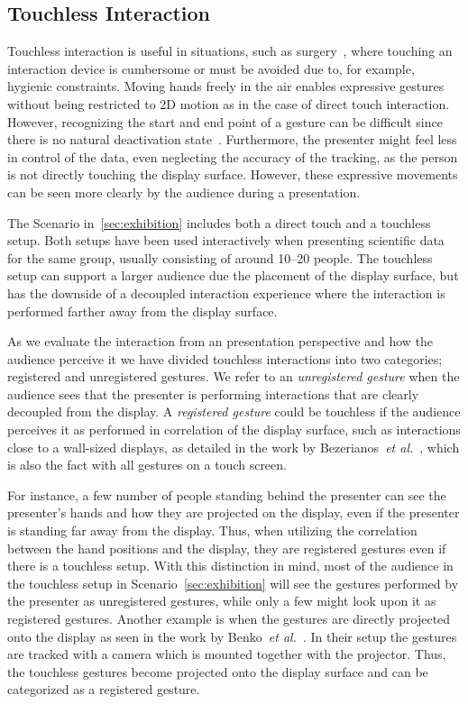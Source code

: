 \documentclass[journal]{vgtc}                %
\begin{document}
\subsection{Touchless Interaction}\label{subsec:touchless}
Touchless interaction is useful in situations, such as surgery~\cite{Mentis:2012:IPI:2207676.2208536}, where touching an interaction device is cumbersome or must be avoided due to, for example, hygienic constraints.
Moving hands freely in the air enables expressive gestures without being restricted to 2D motion as in the case of direct touch interaction.
However, recognizing the start and end point of a gesture can be difficult since there is no natural deactivation state~\cite{Kirmizibayrak:2011:EGB:2087756.2087764}.
Furthermore, the presenter might feel less in control of the data, even neglecting the accuracy of the tracking, as the person is not directly touching the display surface.
However, these expressive movements can be seen more clearly by the audience during a presentation.

The Scenario in~\ref{sec:exhibition} includes both a direct touch and a touchless setup. Both setups have been used interactively when presenting scientific data for the same group, usually consisting of around 10--20 people.
The touchless setup can support a larger audience due the placement of the display surface, but has the downside of a decoupled interaction experience where the interaction is performed farther away from the display surface.

As we evaluate the interaction from an presentation perspective and how the audience perceive it we have divided touchless interactions into two categories; registered and unregistered gestures.
We refer to an \emph{unregistered gesture} when the audience sees that the presenter is performing interactions that are clearly decoupled from the display. 
A \emph{registered gesture} could be touchless if the audience perceives it as performed in correlation of the display surface, such as interactions close to a wall-sized displays, as detailed in the work by Bezerianos~\textit{et al.}~\cite{Bezerianos:2007:DSU:1467769}, which is also the fact with all gestures on a touch screen.

For instance, a few number of people standing behind the presenter can see the presenter's hands and how they are projected on the display, even if the presenter is standing far away from the display.
Thus, when utilizing the correlation between the hand positions and the display, they are registered gestures even if there is a touchless setup. With this distinction in mind, most of the audience in the touchless setup in Scenario~\ref{sec:exhibition} will see the gestures performed by the presenter as unregistered gestures, while only a few might look upon it as registered gestures.
Another example is when the gestures are directly projected onto the display as seen in the work by Benko~\textit{et al.}~\cite{Benko:2010:MII:1936652.1936657}. In their setup the gestures are tracked with a camera which is mounted together with the projector. Thus, the touchless gestures become projected onto the display surface and can be categorized as a registered gesture.
\end{document}
